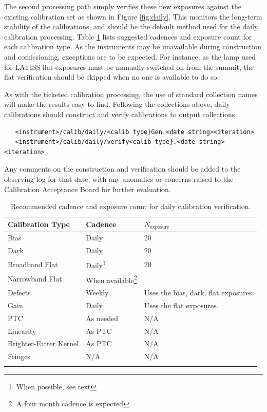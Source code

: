\documentclass[DM,authoryear,toc]{lsstdoc}
\begin{document}
The second processing path simply verifies these new exposures against the existing calibration set as shown in Figure \ref{fig:daily}.  This monitors the long-term stability of the calibrations, and should be the default method used for the daily calibration processing.  Table \ref{tab:cadence} lists suggested cadences and exposure count for each calibration type.  As the instruments may be unavailable during construction and comissioning, exceptions are to be expected.  For instance, as the lamp used for LATISS flat exposures must be manually switched on from the summit, the flat verification should be skipped when no one is available to do so.

As with the ticketed calibration processing, the use of standard collection names will make the results easy to find.  Following the collections above, daily calibrations should construct and verify calibrations to output collections
\begin{verbatim}
   <instrument>/calib/daily/<calib type}Gen.<date string><iteration>
   <instrument>/calib/daily/verify<calib type}.<date string><iteration>
\end{verbatim}

Any comments on the construction and verification should be added to the observing log for that date, with any anomalies or concerns raised to the Calibration Acceptance Board for further evaluation.

\begin{longtable}{l l l}
  Calibration Type & Cadence & $N_{\textrm{exposure}}$ \\
  \hline
  \endhead
  Bias       & Daily  & 20 \\
  Dark       & Daily  & 20 \\
  Broadband Flat       & Daily\footnote{When possible, see text} & 20 \\
  Narrowband Flat & When available\footnote{A four month cadence is expected} & \\
  Defects    & Weekly & Uses the bias, dark, flat exposures. \\
  Gain       & Daily  & Uses the flat exposures. \\
  PTC        & As needed & N/A \\
  Linearity  & As PTC    & N/A \\
  Brighter-Fatter Kernel & As PTC & N/A \\
  Fringes    & N/A  & N/A \\
  \hline
  \caption{Recommended cadence and exposure count for daily calibration verification.}
  \label{tab:cadence}
\end{longtable}
\end{document}
